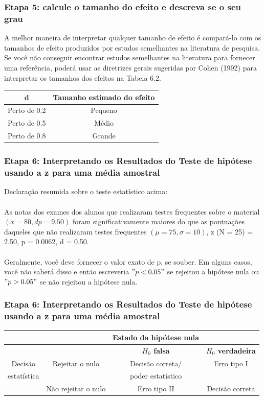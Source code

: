 \documentclass[11pt]{beamer}
\begin{document}
\begin{frame}
\frametitle{Etapa 5: calcule o tamanho do efeito e descreva se o seu grau}
A melhor maneira de interpretar qualquer tamanho de efeito é compará-lo com os tamanhos de efeito produzidos por estudos semelhantes na literatura de pesquisa. Se você não conseguir encontrar estudos semelhantes na literatura para fornecer uma referência, poderá usar as diretrizes gerais sugeridas por Cohen (1992) para interpretar os tamanhos dos efeitos na Tabela 6.2.

\begin{center}
\begin{tabular}{cc} 
 \hline
d  & Tamanho estimado do efeito\\
 \hline
Perto de 0.2 & Pequeno \\
Perto de 0.5 & Médio \\
Perto de 0.8 & Grande \\
 \hline
\end{tabular}
\end{center}   

\end{frame}

\begin{frame}
\frametitle{Etapa 6: Interpretando os Resultados do Teste de hipótese usando a z para uma média amostral}

Declaração resumida sobre o teste estatístico acima:\\~\\
As notas dos exames dos alunos que realizaram testes frequentes sobre o material $(\bar{x} = 80, dp = 9.50)$ foram significativamente maiores do que as pontuações daqueles que não realizaram testes frequentes $(\mu = 75, \sigma = 10)$, z (N = 25) = 2.50, p = 0.0062, d = 0.50.\\~\\

Geralmente, você deve fornecer o valor exato de p, se souber. Em alguns casos, você não saberá disso e então escreveria \("p < 0.05"\) se rejeitou a hipótese nula ou \("p > 0.05"\) se não rejeitou a hipótese nula.
\end{frame}

\begin{frame}
\frametitle{Etapa 6: Interpretando os Resultados do Teste de hipótese usando a z para uma média amostral}

\begin{center}
\begin{tabular}{cccc} 
 \hline
&  & Estado da hipótese nula & \\
 \hline
& & \textbf{$H_0$ falsa} & \textbf{$H_0$ verdadeira}\\
Decisão & Rejeitar o nulo & Decisão correta/ & Erro tipo I \\
estatística &  & poder estatístico &  \\
& Não rejeitar o nulo & Erro tipo II & Decisão correta\\
 \hline
\end{tabular}
\end{center}

\end{frame}
\end{document}
